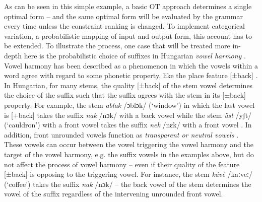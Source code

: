 As can be seen in this simple example, a basic OT approach determines a single optimal form – and the same optimal form will be evaluated by the grammar every time unless the constraint ranking is changed. To implement categorical variation, a probabilistic mapping of input and output form, this account has to be extended. To illustrate the process, one case that will be treated more in-depth here is the probabilistic choice of suffixes in Hungarian \emph{vowel harmony} \citep{HayesLonde2006}. Vowel harmony has been described as a phenomenon in which the vowels within a word agree with regard to some phonetic property, like the place feature [±back] \citep{GafosBenus2006}. In Hungarian, for many stems, the quality  [±back] of the stem vowel determines the choice of the suffix such that the suffix agrees with the stem in its [±back] property. For example, the stem \emph{ablak} /ɔblɔk/ (`window') in which the last vowel is [+back] takes the suffix \emph{nak} /nɔk/ with a back vowel while the stem \emph{üst} /yʃt/ (`cauldron') with a front vowel takes the suffix \emph{nek} /nɛk/ with a front vowel \citep[62]{HayesLonde2006}. In addition, front unrounded vowels function as \emph{transparent or neutral vowels} \citep{HayesLonde2006}. These vowels can occur between the vowel triggering the vowel harmony and the target of the vowel harmony, e.g. the suffix vowels in the examples above, but do not affect the process of vowel harmony – even if their quality of the feature [±back] is opposing to the triggering vowel. For instance, the stem \emph{kávé} /kaːveː/ (`coffee') takes the suffix \emph{nak} /nɔk/ – the back vowel of the stem determines the vowel of the suffix regardless of the intervening unrounded front vowel. 

